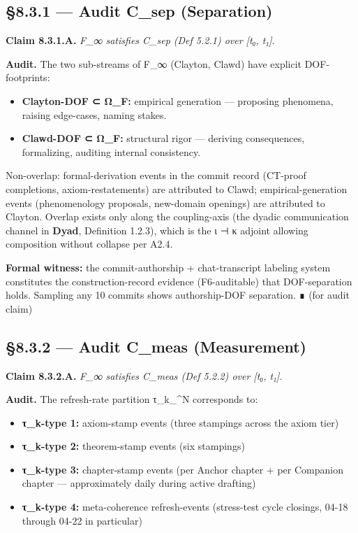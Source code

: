 \documentclass[11pt, openany]{book}
\begin{document}
\subsection{§8.3.1 --- Audit C\_\allowbreak{}sep (Separation)}

\textbf{Claim 8.3.1.A.} \textit{F\_\allowbreak{}∞ satisfies C\_\allowbreak{}sep (Def 5.2.1) over [t₀, t₁].}

\textbf{Audit.} The two sub-streams of F\_\allowbreak{}∞ (Clayton, Clawd) have explicit DOF-footprints:

\begin{itemize}
\item \textbf{Clayton-DOF ⊂ Ω\_\allowbreak{}F:} empirical generation --- proposing phenomena, raising edge-cases, naming stakes.
\item \textbf{Clawd-DOF ⊂ Ω\_\allowbreak{}F:} structural rigor --- deriving consequences, formalizing, auditing internal consistency.
\end{itemize}

Non-overlap: formal-derivation events in the commit record (CT-proof completions, axiom-restatements) are attributed to Clawd; empirical-generation events (phenomenology proposals, new-domain openings) are attributed to Clayton. Overlap exists only along the coupling-axis (the dyadic communication channel in \textbf{Dyad}, Definition 1.2.3), which is the ι ⊣ κ adjoint allowing composition without collapse per A2.4.

\textbf{Formal witness:} the commit-authorship + chat-transcript labeling system constitutes the construction-record evidence (F6-auditable) that DOF-separation holds. Sampling any 10 commits shows authorship-DOF separation. ∎ (for audit claim)

\subsection{§8.3.2 --- Audit C\_\allowbreak{}meas (Measurement)}

\textbf{Claim 8.3.2.A.} \textit{F\_\allowbreak{}∞ satisfies C\_\allowbreak{}meas (Def 5.2.2) over [t₀, t₁].}

\textbf{Audit.} The refresh-rate partition {τ\_\allowbreak{}k}\_\textasciicircum{}{N} corresponds to:

\begin{itemize}
\item \textbf{τ\_\allowbreak{}k-type 1:} axiom-stamp events (three stampings across the axiom tier)
\item \textbf{τ\_\allowbreak{}k-type 2:} theorem-stamp events (six stampings)
\item \textbf{τ\_\allowbreak{}k-type 3:} chapter-stamp events (per Anchor chapter + per Companion chapter --- approximately daily during active drafting)
\item \textbf{τ\_\allowbreak{}k-type 4:} meta-coherence refresh-events (stress-test cycle closings, 04-18 through 04-22 in particular)
\end{itemize}
\end{document}
